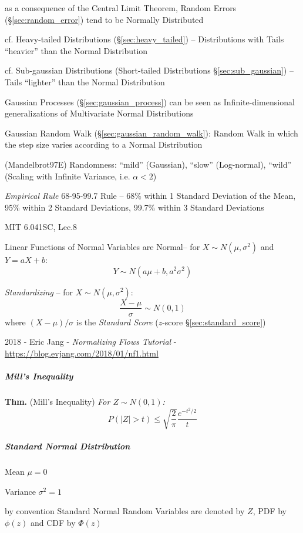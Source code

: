 as a consequence of the Central Limit Theorem, Random Errors
(\S\ref{sec:random_error}) tend to be Normally Distributed

cf. Heavy-tailed Distributions (\S\ref{sec:heavy_tailed}) --
Distributions with Tails ``heavier'' than the Normal Distribution

cf. Sub-gaussian Distributions (Short-tailed Distributions
\S\ref{sec:sub_gaussian}) -- Tails ``lighter'' than the Normal Distribution

\fist Gaussian Processes (\S\ref{sec:gaussian_process}) can be seen as
Infinite-dimensional generalizations of Multivariate Normal Distributions

\fist Gaussian Random Walk (\S\ref{sec:gaussian_random_walk}): Random Walk in
which the step size varies according to a Normal Distribution

(Mandelbrot97E) Randomness: ``mild'' (Gaussian), ``slow'' (Log-normal), ``wild''
(Scaling with Infinite Variance, i.e. $\alpha < 2$)

\emph{Empirical Rule} 68-95-99.7 Rule -- 68\% within 1 Standard Deviation of the
Mean, 95\% within 2 Standard Deviations, 99.7\% within 3 Standard Deviations

MIT 6.041SC, Lec.8

Linear Functions of Normal Variables are Normal--
for $X \sim N(\mu, \sigma^2)$ and $Y = aX + b$:
\[
  Y \sim N(a \mu + b, a^2 \sigma^2)
\]

\emph{Standardizing} -- for $X \sim N(\mu, \sigma^2)$:
\[
  \frac{X - \mu}{\sigma} \sim N(0, 1)
\]
where $(X - \mu)/\sigma$ is the \emph{Standard Score}
($z$-score \S\ref{sec:standard_score})

2018 - Eric Jang
- \emph{Normalizing Flows Tutorial}
- \url{https://blog.evjang.com/2018/01/nf1.html}



\subparagraph{Mill's Inequality}\label{sec:mills_inequality}\hfill

\textbf{Thm.} (Mill's Inequality) \emph{
  For $Z \sim N(0,1)$:
  \[
    P(|Z| > t) \leq \sqrt{\frac{2}{\pi}}\frac{e^{-t^2/2}}{t}
  \]
}



\subparagraph{Standard Normal Distribution}\label{sec:standard_normal}\hfill

Mean $\mu = 0$

Variance $\sigma^2 = 1$

by convention Standard Normal Random Variables are denoted by $Z$, PDF by
$\phi(z)$ and CDF by $\Phi(z)$

